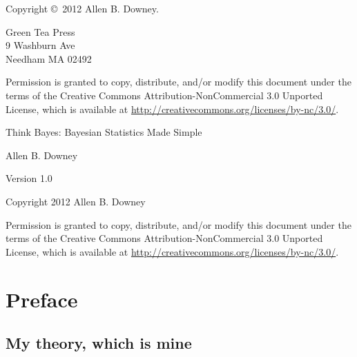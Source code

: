 \documentclass[12pt]{book}
\newcommand{\thetitle}{Think Bayes: Bayesian Statistics Made Simple}
\newcommand{\theversion}{1.0}
\begin{document}
\begin{latexonly}
Copyright \copyright ~2012 Allen B. Downey.


\vspace{0.2in}

\begin{flushleft}
Green Tea Press       \\
9 Washburn Ave \\
Needham MA 02492
\end{flushleft}

Permission is granted to copy, distribute, and/or modify this document
under the terms of the Creative Commons Attribution-NonCommercial 3.0 Unported
License, which is available at \url{http://creativecommons.org/licenses/by-nc/3.0/}.

\vspace{0.2in}

\end{latexonly}



\begin{htmlonly}


{\Large \thetitle}

{\large Allen B. Downey}

Version \theversion

\vspace{0.25in}

Copyright 2012 Allen B. Downey

\vspace{0.25in}

Permission is granted to copy, distribute, and/or modify this document
under the terms of the Creative Commons Attribution-NonCommercial 3.0
Unported License, which is available at
\url{http://creativecommons.org/licenses/by-nc/3.0/}.

\setcounter{chapter}{-1}

\end{htmlonly}

\fi

\chapter{Preface}
\label{preface}

\section{My theory, which is mine}
\end{document}
